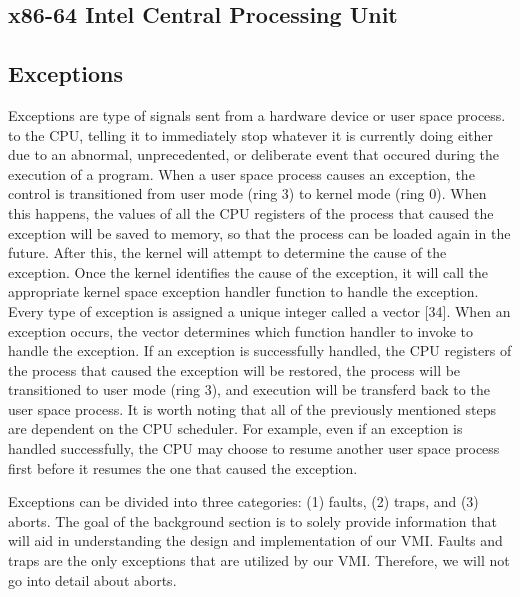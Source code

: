 \documentclass{report}
\begin{document}
\begin{spacing}{1.5}
\section{x86-64 Intel Central Processing Unit}


\subsection{Exceptions}
{\large
Exceptions are type of signals sent from a hardware device or user space process. to the CPU, telling it to immediately stop whatever it is currently doing either due to an abnormal, unprecedented, or deliberate event that occured during the execution of a program. When a user space process causes an exception, the control is transitioned from user mode (ring 3) to kernel mode (ring 0). When this happens, the values of all the CPU registers of the process that caused the exception will be saved to memory, so that the process can be loaded again in the future. After this, the kernel will attempt to determine the cause of the exception. Once the kernel identifies the cause of the exception, it will call the appropriate kernel space exception handler function to handle the exception. Every type of exception is assigned a unique integer called a vector [34]. When an exception occurs, the vector determines which function handler to invoke to handle the exception. If an exception is successfully handled, the CPU registers of the process that caused the exception will be restored, the process will be transitioned to user mode (ring 3), and execution will be transferd back to the user space process. It is worth noting that all of the previously mentioned steps are dependent on the CPU scheduler. For example, even if an exception is handled successfully, the CPU may choose to resume another user space process first before it resumes the one that caused the exception.
\newline
}

{\large
Exceptions can be divided into three categories: (1) faults, (2) traps, and (3) aborts. The goal of the background section is to solely provide information that will aid in understanding the design and implementation of our VMI. Faults and traps are the only exceptions that are utilized by our VMI. Therefore, we will not go into detail about aborts.  
}


\end{spacing}
\end{document}
